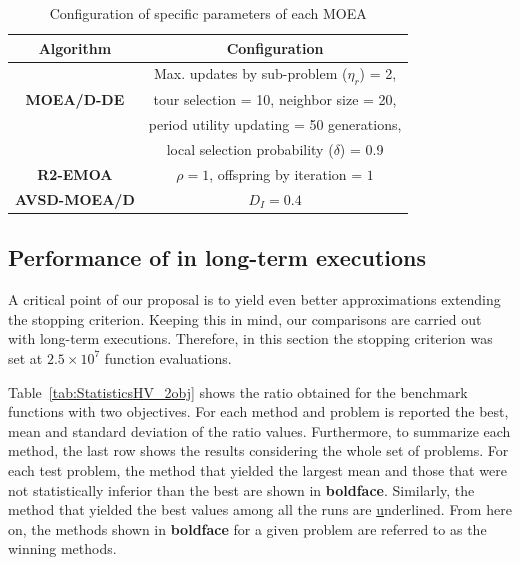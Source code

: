 \begin{table}[t]
\centering
\caption{Configuration of specific parameters of each MOEA}
\label{tab:Parametrization}
\begin{tabular}{c|c}
\hline
\textbf{Algorithm} & \textbf{Configuration} \\ \hline
\multirow{3}{*}{
\textbf{MOEA/D-DE}} & Max. updates by sub-problem ($\eta_r$) = 2, \\
 & tour selection = 10,   neighbor size = 20, \\
 & period utility updating = 50 generations, \\
 & local selection probability ($\delta$) = 0.9\\ \hline
\textbf{R2-EMOA} & $\rho=1$, offspring by iteration = $1$ \\ \hline
\textbf{AVSD-MOEA/D} & $D_I=0.4$ \\ \hline
\end{tabular}
\end{table}



\subsection{Performance of \MOEAS{} in long-term executions}


A critical point of our proposal is to yield even better approximations extending the stopping criterion.
%
Keeping this in mind, our comparisons are carried out with long-term executions.
%
Therefore, in this section the stopping criterion was set at $2.5 \times 10^7$ function evaluations.
%

%
Table~\ref{tab:StatisticsHV_2obj} shows the \HV{} ratio obtained for the benchmark functions with two objectives.
%
For each method and problem is reported the best, mean and standard deviation of the \HV{} ratio values.
%
Furthermore, to summarize each method, the last row shows the results considering the whole set of problems.
%
For each test problem, the method that yielded the largest mean and those that were not statistically inferior than the best are shown in \textbf{boldface}.
%
%
Similarly, the method that yielded the best \HV{} values among all the runs are {\ul underlined}.
%
From here on, the methods shown in {\bf boldface} for a given problem are referred to as the winning methods.
%

